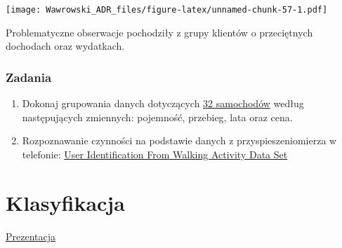 \documentclass[
]{book}
\newenvironment{Shaded}{\begin{snugshade}}{\end{snugshade}}
\newcommand{\DataTypeTok}[1]{\textcolor[rgb]{0.13,0.29,0.53}{#1}}
\newcommand{\KeywordTok}[1]{\textcolor[rgb]{0.13,0.29,0.53}{\textbf{#1}}}
\newcommand{\NormalTok}[1]{#1}
\newcommand{\OperatorTok}[1]{\textcolor[rgb]{0.81,0.36,0.00}{\textbf{#1}}}
\newcommand{\StringTok}[1]{\textcolor[rgb]{0.31,0.60,0.02}{#1}}
\begin{document}
\begin{Shaded}
\end{Shaded}

\texttt{[image: Wawrowski\_ADR\_files/figure-latex/unnamed-chunk-57-1.pdf]}

Problematyczne obserwacje pochodziły z grupy klientów o przeciętnych dochodach oraz wydatkach.

\hypertarget{zadania}{%
\subsection{Zadania}\label{zadania}}

\begin{enumerate}
\def\labelenumi{\arabic{enumi}.}
\item
  Dokonaj grupowania danych dotyczących \href{data/auta.csv}{32 samochodów} według następujących zmiennych: pojemność, przebieg, lata oraz cena.
\item
  Rozpoznawanie czynności na podstawie danych z przyspieszeniomierza w telefonie: \href{http://archive.ics.uci.edu/ml/datasets/User+Identification+From+Walking+Activity\#}{User Identification From Walking Activity Data Set}
\end{enumerate}

\hypertarget{klasyfikacja}{%
\chapter{Klasyfikacja}\label{klasyfikacja}}

\href{presentations/06_klasyfikacja.html}{Prezentacja}
\end{document}
